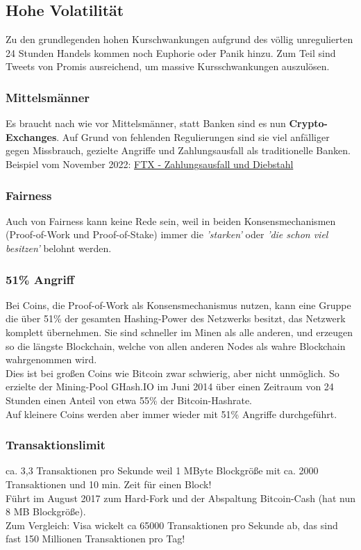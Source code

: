 \documentclass[10pt,a4paper,titlepage]{article}
\begin{document}
\subsection{Hohe Volatilität}
Zu den grundlegenden hohen Kurschwankungen aufgrund des völlig unregulierten 24 Stunden Handels kommen noch Euphorie oder Panik hinzu. Zum Teil sind Tweets von Promis ausreichend, um massive Kursschwankungen auszulösen.
\subsubsection{Mittelsmänner}
Es braucht nach wie vor Mittelsmänner, statt Banken sind es nun \textbf{Crypto-Exchanges}. Auf Grund von fehlenden Regulierungen sind sie viel anfälliger gegen Missbrauch, gezielte Angriffe und Zahlungsausfall als traditionelle Banken.\\
Beispiel vom November 2022: \href{https://www.derstandard.at/story/2000140794202/kryptoboerse-kraken-will-mutmasslichen-ftx-hacker-identifiziert-haben}{\color{blue}FTX - Zahlungsausfall und Diebstahl}
\subsubsection{Fairness}
Auch von Fairness kann keine Rede sein, weil in beiden Konsensmechanismen (Proof-of-Work und Proof-of-Stake) immer die \textit{'starken'} oder \textit{'die schon viel besitzen'} belohnt werden.
\subsubsection{51\% Angriff} \label{51}
Bei Coins, die Proof-of-Work als Konsensmechanismus nutzen, kann eine Gruppe die über 51\% der gesamten Hashing-Power des Netzwerks besitzt, das Netzwerk komplett übernehmen. Sie sind schneller im Minen als alle anderen, und erzeugen so die längste Blockchain, welche von allen anderen Nodes als wahre Blockchain wahrgenommen wird.\\
Dies ist bei großen Coins wie Bitcoin zwar schwierig, aber nicht unmöglich. So erzielte der Mining-Pool GHash.IO im Juni 2014 über einen Zeitraum von 24 Stunden einen Anteil von etwa 55\% der Bitcoin-Hashrate.\\
Auf kleinere Coins werden aber immer wieder mit 51\% Angriffe durchgeführt. 
\subsubsection{Transaktionslimit}
ca. 3,3 Transaktionen pro Sekunde weil 1 MByte Blockgröße mit ca. 2000 Transaktionen und 10 min. Zeit für einen Block!\\
Führt im August 2017 zum Hard-Fork und der Abspaltung Bitcoin-Cash (hat nun 8 MB Blockgröße).\\
Zum Vergleich: Visa wickelt ca 65000 Transaktionen pro Sekunde ab, das sind fast 150 Millionen Transaktionen pro Tag!
\end{document}
